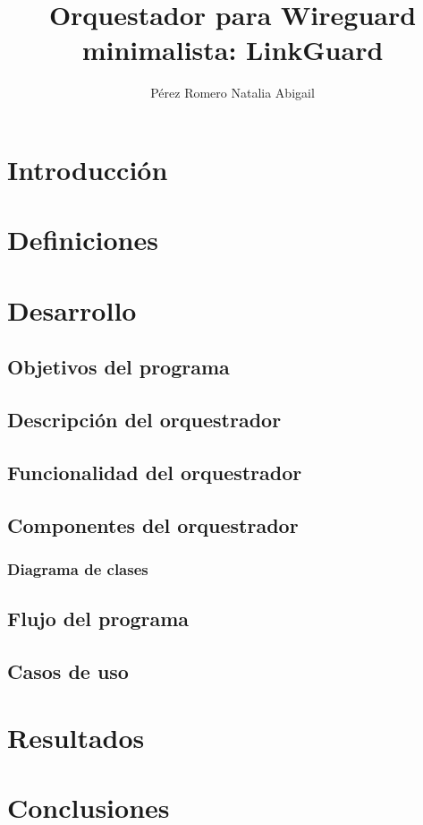 \documentclass[letterpaper,12pt,oneside]{book}
\author{Pérez Romero Natalia Abigail}
\title{Orquestador para Wireguard minimalista: LinkGuard}
\begin{document}
\frontmatter
\maketitle


\mainmatter

\tableofcontents

\chapter{Introducción} %



\chapter{Definiciones}


\chapter{Desarrollo}

\section{Objetivos del programa}


\section{Descripción del orquestrador}


\section{Funcionalidad del orquestrador}



\section{Componentes del orquestrador}

\subsection{Diagrama de clases}


\section{Flujo del programa}



\section{Casos de uso}



\chapter{Resultados}  %



\chapter{Conclusiones}  %


\end{document}
